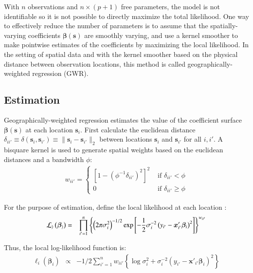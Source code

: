 \documentclass[authoryear, review, 11pt]{elsarticle}
\begin{document}
	With $n$ observations and $n \times (p+1)$ free parameters, the model is not identifiable so it is not possible to directly maximize the total likelihood. One way to effectively reduce the number of parameters is to assume that the spatially-varying coefficients $\bm{\beta}(\bm{s})$ are smoothly varying, and use a kernel smoother to make pointwise estimates of the coefficients by maximizing the local likelihood. In the setting of spatial data and with the kernel smoother based on the physical distance between observation locations, this method is called geographically-weighted regression (GWR).
		
	\subsection{Estimation}
		
	Geographically-weighted regression estimates the value of the coefficient surface $\bm{\beta}(\bm{s})$ at each location $\bm{s}_i$. First calculate the euclidean distance $\delta_{ii'} \equiv \delta\left(\bm{s}_i, \bm{s}_{i'}\right) \equiv \|\bm{s}_i  -\bm{s}_{i'}\|_2$ between locations $\bm{s}_i$ and $\bm{s}_{i'}$ for all $i, i'$. A bisquare kernel is used to generate spatial weights based on the euclidean distances and a bandwidth $\phi$:\\
	
	\begin{eqnarray}
		w_{ii'} = \begin{cases} \left[1-\left(\phi^{-1}\delta_{ii'}\right)^2\right]^2 &\mbox{ if } \delta_{ii'} < \phi \\ 0 &\mbox{ if } \delta_{ii'} \geq \phi \end{cases}
	\end{eqnarray}
	
	For the purpose of estimation, define the local likelihood at each location \citep{Fotheringham:2002}:
	\begin{eqnarray}
		\cal{L}_i \left(\bm{\beta}_i \right) &=& \prod_{i'=1}^n \left\{ \left(2 \pi \sigma^2_i  \right)^{-1/2}  \exp\left[-\frac{1}{2} \sigma^{-2}_i  \left(y_{i'} - \bm{x}'_{i'} \bm{\beta}_i \right)^2 \right] \right\} ^ {w_{ii'}}
	\end{eqnarray}
			
	Thus, the local log-likelihood function is:
	\begin{eqnarray}\label{eq:local-log-likelihood}
		\ell_i\left(\bm{\beta}_i\right) &\propto& -1/2 \sum_{i'=1}^n w_{ii'} \left\{ \log{\sigma^2_i}  + \sigma^{-2}_i  \left(y_{i'} - \bm{x}'_{i'} \bm{\beta}_i \right)^2 \right\}
	\end{eqnarray}
	
\end{document}
